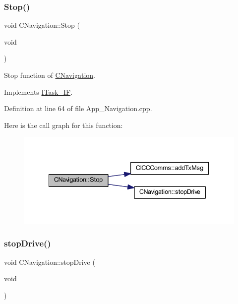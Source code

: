 \subsubsection{\texorpdfstring{Stop()}{Stop()}}
{\footnotesize\ttfamily void C\+Navigation\+::\+Stop (\begin{DoxyParamCaption}\item[{void}]{ }\end{DoxyParamCaption})\hspace{0.3cm}{\ttfamily [virtual]}}



Stop function of \mbox{\hyperlink{class_c_navigation}{C\+Navigation}}. 



Implements \mbox{\hyperlink{class_i_task___i_f_af5f8fba86704c7e36d0e4681d58300c6}{I\+Task\+\_\+\+IF}}.



Definition at line 64 of file App\+\_\+\+Navigation.\+cpp.

Here is the call graph for this function\+:\nopagebreak
\begin{figure}[H]
\begin{center}
\leavevmode
\includegraphics[width=334pt]{class_c_navigation_a3cc8f7fdd003d6b2c5056b87ff93edd9_cgraph}
\end{center}
\end{figure}
\mbox{\label{class_c_navigation_a06ce71124d487f1f9febf36a0e4b2a5d}} 
\subsubsection{\texorpdfstring{stopDrive()}{stopDrive()}}
{\footnotesize\ttfamily void C\+Navigation\+::stop\+Drive (\begin{DoxyParamCaption}\item[{void}]{ }\end{DoxyParamCaption})\hspace{0.3cm}{\ttfamily [virtual]}}



